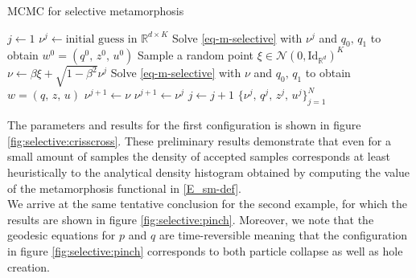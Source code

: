\documentclass[runningheads]{llncs}
\newcommand{\RdK}{\mathbb{R}^{d\times K}}
\begin{document}
\begin{algorithm}[h!]
\begin{algorithmic}
\caption{MCMC for selective metamorphosis}\label{algo:mcmc}
\Procedure{mcmcSM}{$N$, $K$, $\mathbf q_0$, $\mathbf q_1$, $\beta\in (0,1]$}
\State $j \gets 1$
\State $\nu^j \gets \text{initial guess in } \RdK$
\State Solve \eqref{eq-m-selective} with $\nu^j$ and $q_0,\,q_1$ to obtain $w^0 = (q^0,\, z^0,\, u^0)$
\State Sample a random point $\xi \in \mathcal N(0, \text{Id}_{\mathbb R^d})^K$
\State $\nu \gets \beta \xi + \sqrt{1-\beta^2} \nu^j$
\State Solve \eqref{eq-m-selective} with $\nu$ and $q_0,\,q_1$ to obtain $w = (q,\, z,\, u)$
    \State $\nu^{j+1} \gets \nu$
\Else
    \State $\nu^{j+1} \gets \nu^j$
\EndIf
\State $j\gets j+1$
\EndWhile
\Return $\{\nu^j,\, q^j,\, z^j,\, u^j\}_{j=1}^N$
\EndProcedure
\end{algorithmic}
\end{algorithm}


The parameters and results for the first configuration is
shown in figure \ref{fig:selective:crisscross}. These preliminary results demonstrate 
that even for a small amount of samples the density of accepted samples
corresponds at least heuristically to the analytical density histogram obtained
by computing the value of the metamorphosis functional in \eqref{E_sm-def}.\\

We arrive at the same tentative conclusion for the second example, for which the
results are shown in figure \eqref{fig:selective:pinch}. Moreover, we note that
the geodesic equations for $p$ and $q$ are time-reversible meaning that the
configuration in figure \ref{fig:selective:pinch} corresponds to both particle
collapse as well as hole creation. 
\end{document}
